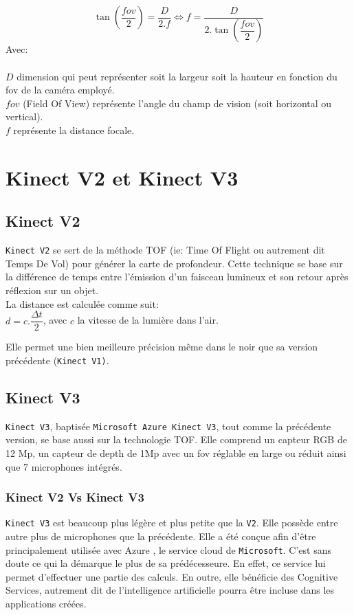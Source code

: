 \documentclass[a4paper, 12pt]{book}
\begin{document}
\begin{equation}
 \tan \left( {\dfrac{fov}{2}}\right) = \dfrac{D}{2.f}    \Leftrightarrow   f = \dfrac{D}{2. \tan \left( {\dfrac{fov}{2}}\right)}
\end{equation}
Avec:\\ \\
$D$  dimension qui peut représenter soit la largeur soit la hauteur en fonction du fov de la caméra employé. \\
$fov$ (Field Of View) représente l'angle du champ de vision (soit horizontal ou vertical). \\
$f$ représente la distance focale.


\section{Kinect V2 et Kinect V3}
\subsection{Kinect V2}
\texttt{Kinect V2} se sert de la méthode TOF (ie: Time Of Flight ou autrement dit Temps De Vol) pour générer la carte de profondeur. Cette technique se base sur la différence de temps entre l'émission d'un faisceau lumineux et son retour après réflexion sur un objet. \\ La distance est calculée comme suit:\\
$ d = c.\dfrac{\Delta t}{2} $, avec $c$ la vitesse de la lumière dans l'air.\\ \par Elle permet une bien meilleure précision même dans le noir que sa version précédente (\texttt{Kinect V1)}. 

\subsection{Kinect V3}
\texttt{Kinect V3}, baptisée \texttt{Microsoft Azure Kinect V3}, tout comme la précédente version, se base aussi sur la technologie TOF. Elle comprend un capteur RGB de 12 Mp, un capteur de depth de 1Mp avec un fov réglable en large ou réduit ainsi que 7 microphones intégrés.  
 
\subsubsection{Kinect V2 Vs Kinect V3}
\texttt{Kinect V3} est beaucoup plus légère et plus petite que la \texttt{V2}. Elle possède entre autre plus de microphones que la précédente. Elle a été conçue afin d'être principalement utilisée avec Azure , le service cloud de \texttt{Microsoft}. C'est sans doute ce qui la démarque le plus de sa prédécesseure. En effet, ce service lui permet d'effectuer une partie des calculs. En outre, elle bénéficie des Cognitive Services, autrement dit de l'intelligence artificielle pourra être incluse dans les applications créées.
\end{document}
